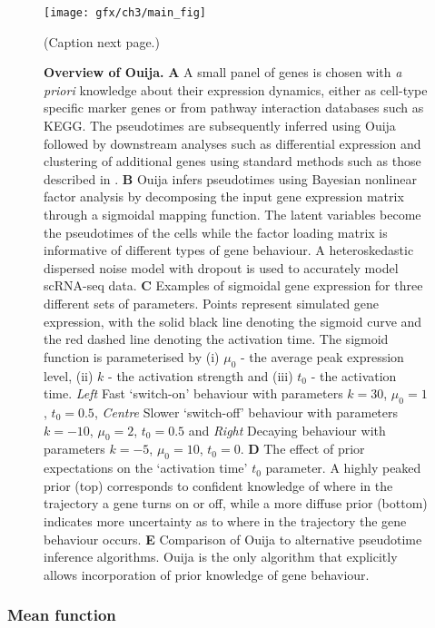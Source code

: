 \begin{figure}%
	\centering
	\texttt{[image: gfx/ch3/main\_fig]}
  \caption{(Caption next page.)} \label{fig:main}
\end{figure}
\addtocounter{figure}{-1}
\begin{figure}
  \caption{{\bf Overview of Ouija.}
  \textbf{A} A small panel of genes is chosen with \emph{a priori} knowledge about their expression dynamics, either as cell-type specific marker genes or from pathway interaction databases such as KEGG. The pseudotimes are subsequently inferred using Ouija followed by downstream analyses such as differential expression and clustering of additional genes  using standard methods such as those described in \cite{Trapnell2014-xi}.
  \textbf{B} Ouija infers pseudotimes using Bayesian nonlinear factor analysis by decomposing the input gene expression matrix through a sigmoidal mapping function. The latent variables become the pseudotimes of the cells while the factor loading matrix is informative of different types of gene behaviour. A heteroskedastic dispersed noise model with dropout is used to accurately model scRNA-seq data.
  \textbf{C}  Examples of sigmoidal gene expression for three different sets of parameters. Points represent simulated gene expression, with the solid black line denoting the sigmoid curve and the red dashed line denoting the activation time.
  The sigmoid function is parameterised by (i) $\mu_0$ - the average peak expression level, (ii) $k$ - the activation strength and (iii) $t_0$ - the activation time. \emph{Left} Fast `switch-on' behaviour with parameters $k= 30$, $\mu_0 = 1$, $t_0 = 0.5$, \emph{Centre} Slower `switch-off' behaviour with parameters $k= -10$, $\mu_0 = 2$, $t_0 = 0.5$ and \emph{Right} Decaying behaviour with parameters $k= -5$, $\mu_0 = 10$, $t_0 = 0$.
  \textbf{D} The effect of prior expectations on the `activation time' $t_0$ parameter. A highly peaked prior (top) corresponds to confident knowledge of where in the trajectory a gene turns on or off, while a more diffuse prior (bottom) indicates more uncertainty as to where in the trajectory the gene behaviour occurs.
  \textbf{E} Comparison of Ouija to alternative pseudotime inference algorithms. Ouija is the only algorithm that explicitly allows incorporation of prior knowledge of gene behaviour.}
\end{figure}


\subsubsection{Mean function}

